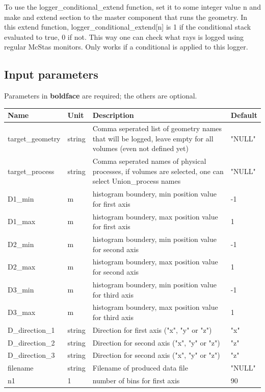 To use the logger\_conditional\_extend function, set it to some integer value n and make and extend section to the master component that runs the geometry. In this extend function, logger\_conditional\_extend[n] is 1 if the conditional stack evaluated to true, 0 if not. This way one can check what rays is logged using regular McStas monitors. Only works if a conditional is applied to this logger.

\subsection*{Input parameters}
Parameters in \textbf{boldface} are required; the others are optional.

\begin{longtable}{p{}p{}p{}p{}}
\toprule
\textbf{Name} & \textbf{Unit} & \textbf{Description} & \textbf{Default} \\
\midrule
\endhead
target\_geometry & string & Comma seperated list of geometry names that will be logged, leave empty for all volumes (even not defined yet) & "NULL" \\
target\_process & string & Comma seperated names of physical processes, if volumes are selected, one can select Union\_process names & "NULL" \\
D1\_min & m & histogram boundery, min position value for first axis & -1 \\
D1\_max & m & histogram boundery, max position value for first axis & 1 \\
D2\_min & m & histogram boundery, min position value for second axis & -1 \\
D2\_max & m & histogram boundery, max position value for second axis & 1 \\
D3\_min & m & histogram boundery, min position value for third axis & -1 \\
D3\_max & m & histogram boundery, max position value for third axis & 1 \\
D\_direction\_1 & string & Direction for first axis ("x", "y" or "z") & "x" \\
D\_direction\_2 & string & Direction for second axis ("x", "y" or "z") & "z" \\
D\_direction\_3 & string & Direction for second axis ("x", "y" or "z") & "z" \\
filename & string & Filename of produced data file & "NULL" \\
n1 & 1 & number of bins for first axis & 90 \\

\end{longtable}

